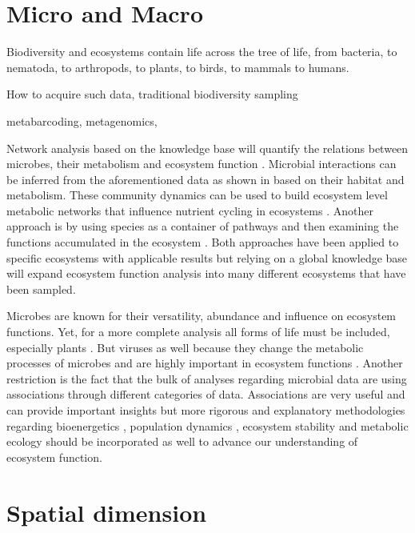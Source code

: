 \section{Micro and Macro}
\label{sec:crete-micro-macro}

Biodiversity and ecosystems contain life across the tree of life, from
bacteria, to nematoda, to arthropods, to plants, to birds, to mammals to 
humans. 

How to acquire such data, traditional biodiversity sampling 

metabarcoding, 
metagenomics,

Network analysis based on the knowledge base will quantify the relations
between microbes, their metabolism and ecosystem
function \parencite{graham2016Microbes,muller2018Using, perez_garcia2016Metabolic}.
Microbial interactions can be inferred from the aforementioned data as shown
in \parencite{machado2021Polarization} based on their habitat and metabolism.
These community dynamics can be used to build ecosystem level metabolic
networks \parencite{perez_garcia2016Metabolic} that influence nutrient cycling in
ecosystems \parencite{bauer2018Network}. Another approach is by using species as a
container of pathways and then examining the functions accumulated in the
ecosystem \parencite{loucaDecouplingFunctionTaxonomy2016}. Both approaches have
been applied to specific ecosystems with applicable results but relying on a
global knowledge base will expand ecosystem function analysis into many
different ecosystems that have been sampled.

Microbes are known for their versatility, abundance and influence on ecosystem
functions. Yet, for a more complete analysis all forms of life must be included,
especially plants \parencite{thompson2012Food}. But viruses as well because they
change the metabolic processes of microbes and are highly important in
ecosystem functions \parencite{hurwitz2016Viral}. Another restriction is the fact
that the bulk of analyses regarding microbial data are using associations
through different categories of data. Associations are very useful and can
provide important insights but more rigorous and explanatory methodologies
regarding bioenergetics \parencite{kempes2012Growth}, population dynamics
\parencite{gonze2018Microbial}, ecosystem stability \parencite{berdugo2020Global} and
metabolic ecology \parencite{brown2004METABOLIC} should be incorporated as well to
advance our understanding of ecosystem function.

\section{Spatial dimension}
\label{sec:crete-spatial}

